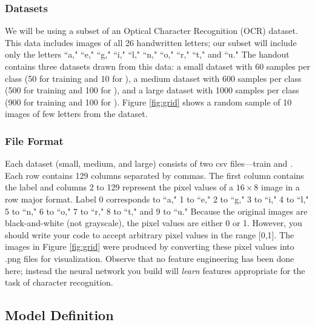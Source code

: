 \subsubsection*{Datasets} We will be using a subset of an Optical Character Recognition (OCR) dataset. This data includes images of all 26 handwritten letters; our subset will include only the letters ``a," ``e," ``g," ``i," ``l," ``n," ``o," ``r," ``t," and ``u."  The handout contains three datasets drawn from this data: a small dataset with 60 samples per class (50 for training and 10 for \ntset), a medium dataset with 600 samples per class (500 for training and 100 for \ntset), and a large dataset with 1000 samples per class (900 for training and 100 for \ntset). Figure \ref{fig:grid} shows a random sample of 10 images of few letters from the dataset.

\subsubsection*{File Format} Each dataset (small, medium, and large) consists of two csv files---train and \ntset. Each row contains 129 columns separated by commas. The first column contains the label and columns 2 to 129 represent the pixel values of a $16 \times 8$ image in a row major format. Label 0 corresponds to ``a," 1 to ``e," 2 to ``g," 3 to ``i," 4 to ``l," 5 to ``n," 6 to ``o," 7 to ``r," 8 to ``t," and 9 to ``u."
%
Because the original images are black-and-white (not grayscale), the pixel values are either 0 or 1. However, you should write your code to accept arbitrary pixel values in the range [0,1]. The images in Figure \ref{fig:grid} were produced by converting these pixel values into .png files for visualization. Observe that no feature engineering has been done here; instead the neural network you build will \emph{learn} features appropriate for the task of character recognition.


\subsection{Model Definition}

